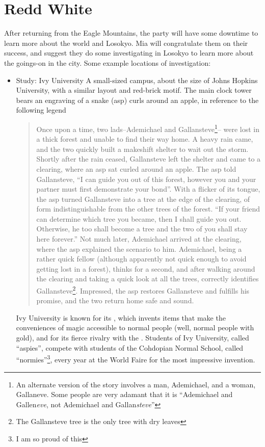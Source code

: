 \section{Redd White}
After returning from the Eagle Mountains, the party will have some downtime to learn more about the world and Losokyo. Mia will congratulate them on their success, and suggest they do some investigating in Losokyo to learn more about the goings-on in the city. Some example locations of investigation:
\begin{itemize}
\item Study: Ivy University
A small-sized campus, about the size of Johns Hopkins University, with a similar layout and red-brick motif. The main clock tower bears an engraving of a snake (asp) curls around an apple, in reference to the following legend
\begin{quote}
Once upon a time, two lads--Ademichael and Gallansteve\footnote{An alternate version of the story involves a man, Ademichael, and a woman, Gallaneve. Some people are very adamant that it is ``Ademichael and Gallen\textit{eve}, not Ademichael and Gallan\textit{steve}''}-- were lost in a thick forest and unable to find their way home. A heavy rain came, and the two quickly built a makeshift shelter to wait out the storm. Shortly after the rain ceased, Gallansteve left the shelter and came to a clearing, where an asp sat curled around an apple. The asp told Gallansteve, ``I can guide you out of this forest, however you and your partner must first demonstrate your bond''. With a flicker of its tongue, the asp turned Gallansteve into a tree at the edge of the clearing, of form indistinguishable from the other trees of the forest. ``If your friend can determine which tree you became, then I shall guide you out. Otherwise, he too shall become a tree and the two of you shall stay here forever.'' Not much later, Ademichael arrived at the clearing, where the asp explained the scenario to him. Ademichael, being a rather quick fellow (although apparently not quick enough to avoid getting lost in a forest), thinks for a second, and after walking around the clearing and taking a quick look at all the trees, correctly identifies Gallansteve\footnote{The Gallansteve tree is the only tree with dry leaves}. Impressed, the asp restores Gallansteve and fulfills his promise, and the two return home safe and sound.
\end{quote}
Ivy University is known for its , which invents items that make the conveniences of magic accessible to normal people (well, normal people with gold), and for its fierce rivalry with the . Students of Ivy University, called ``aspies'', compete with students of the Cohdopian Normal School, called ``normies''\footnote{I am so proud of this}, every year at the World Faire for the most impressive invention.


\end{itemize}
